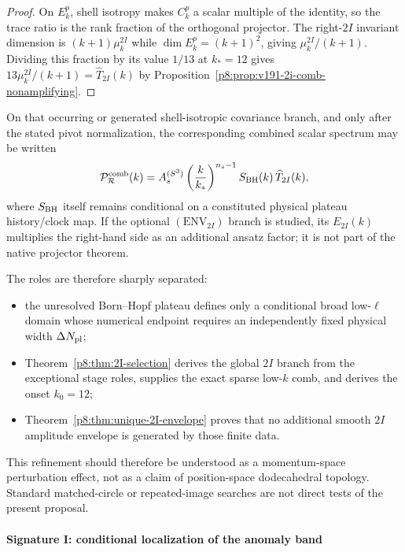 \documentclass[12pt,a4paper]{article}
\begin{document}
\begin{proof}
On $E_k^p$, shell isotropy makes $C_k^p$ a scalar multiple of the identity,
so the trace ratio is the rank fraction of the orthogonal projector.  The
right-$2I$ invariant dimension is $(k+1)\mu_k^{2I}$ while
$\dim E_k^p=(k+1)^2$, giving $\mu_k^{2I}/(k+1)$.  Dividing this fraction by
its value $1/13$ at $k_*=12$ gives
$13\mu_k^{2I}/(k+1)=\widehat T_{2I}(k)$ by
Proposition~\ref{p8:prop:v191-2i-comb-nonamplifying}.
\end{proof}

On that occurring or generated shell-isotropic covariance branch, and only
after the stated pivot normalization, the corresponding combined scalar
spectrum may be written
\begin{equation}
\label{p8:eq:PR-combined-2I}
\mathcal P_{\mathcal R}^{\rm comb}(k)
=
A_s^{(S^3)}
\left(\frac{k}{k_*}\right)^{n_s-1}
S_{\rm BH}(k)\,
\widehat T_{2I}(k),
\end{equation}
where \(S_{\rm BH}\) itself remains conditional on a constituted physical
plateau history/clock map.  If the optional \((\mathrm{ENV}_{2I})\) branch is
studied, its \(E_{2I}(k)\) multiplies the right-hand side as an additional
ansatz factor; it is not part of the native projector theorem.

The roles are therefore sharply separated:
\begin{itemize}
    \item the unresolved Born--Hopf plateau defines only a conditional broad low-\(\ell\) domain whose numerical endpoint requires an independently fixed physical width \(\Delta N_{\rm pl}\);
    \item Theorem~\ref{p8:thm:2I-selection} derives the global \(2I\) branch
    from the exceptional stage roles, supplies the exact sparse low-\(k\)
    comb, and derives the onset \(k_0=12\);
    \item Theorem~\ref{p8:thm:unique-2I-envelope} proves that no additional smooth \(2I\) amplitude envelope is generated by those finite data.
\end{itemize}

This refinement should therefore be understood as a momentum-space perturbation effect, not as a claim of position-space dodecahedral topology. Standard matched-circle or repeated-image searches are not direct tests of the present proposal.


\paragraph{Signature I: conditional localization of the anomaly band}
\label{p8:subsec:bh-cutoff}
\end{document}
